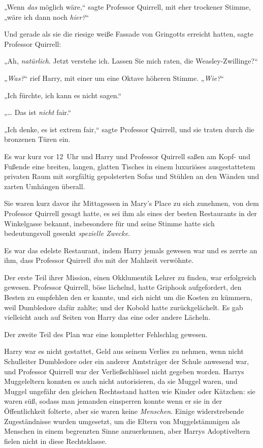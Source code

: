 {„Wenn \emph{das} möglich wäre,“ sagte Professor Quirrell, mit eher trockener Stimme, „wäre ich dann noch \emph{hier?}“

Und gerade als sie die riesige weiße Fassade von Gringotts erreicht hatten, sagte Professor Quirrell:

„Ah, \emph{natürlich}. Jetzt verstehe ich. Lassen Sie mich raten, die Weasley-Zwillinge?“

„\emph{Was?}“ rief Harry, mit einer um eine Oktave höheren Stimme. „\emph{Wie?}“

„Ich fürchte, ich kann es nicht sagen.“

„… Das ist \emph{nicht} fair.“

„Ich denke, es ist extrem fair,“ sagte Professor Quirrell, und sie traten durch die bronzenen Türen ein.

Es war kurz vor 12~Uhr und Harry und Professor Quirrell saßen am Kopf- und Fußende eine breiten, langen, glatten Tisches in einem luxuriöses ausgestattetem privaten Raum mit sorgfältig gepolsterten Sofas und Stühlen an den Wänden und zarten Umhängen überall.

Sie waren kurz davor ihr Mittagessen in Mary's Place zu sich zunehmen, von dem Professor Quirrell gesagt hatte, es sei ihm als eines der besten Restaurants in der Winkelgasse bekannt, insbesondere für \later und seine Stimme hatte sich bedeutungsvoll gesenkt \later \emph{spezielle Zwecke.}

Es war das edelste Restaurant, indem Harry jemals gewesen war und es zerrte an ihm, dass Professor Quirrell \emph{ihn} mit der Mahlzeit verwöhnte.

Der erste Teil ihrer Mission, einen Okklumentik Lehrer zu finden, war erfolgreich gewesen. Professor Quirrell, böse lächelnd, hatte Griphook aufgefordert, den Besten zu empfehlen den er kannte, und sich nicht um die Kosten zu kümmern, weil Dumbledore dafür zahlte; und der Kobold hatte zurückgelächelt. Es gab vielleicht auch auf Seiten von Harry das eine oder andere Lächeln.

Der zweite Teil des Plan war eine kompletter Fehlschlag gewesen.

Harry war es nicht gestattet, Geld aus seinem Verlies zu nehmen, wenn nicht Schulleiter Dumbledore oder ein anderer Amtsträger der Schule anwesend war, und Professor Quirrell war der Verließschlüssel nicht gegeben worden. Harrys Muggeleltern konnten es auch nicht autorisieren, da sie Muggel waren, und Muggel ungefähr den gleichen Rechtsstand hatten wie Kinder oder Kätzchen: sie waren süß, sodass man jemanden einsperren konnte wenn er sie in der Öffentlichkeit folterte, aber sie waren keine \emph{Menschen}. Einige widerstrebende Zugeständnisse wurden umgesetzt, um die Eltern von Muggelstämmigen als Menschen in einem begrenzten Sinne anzuerkennen, aber Harrys Adoptiveltern fielen nicht in diese Rechtsklasse.

}
